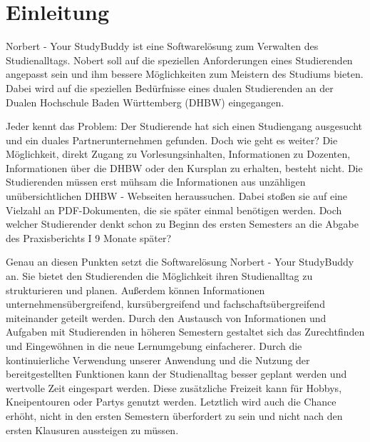 
\chapter{Einleitung}
Norbert - Your StudyBuddy ist eine Softwarelösung zum Verwalten des Studienalltags. Nobert soll auf die speziellen Anforderungen eines Studierenden angepasst sein und ihm bessere Möglichkeiten zum Meistern des Studiums bieten. Dabei wird auf die speziellen Bedürfnisse eines dualen Studierenden an der Dualen Hochschule Baden Württemberg (DHBW) eingegangen.

Jeder kennt das Problem: Der Studierende hat sich einen Studiengang ausgesucht und ein duales Partnerunternehmen gefunden. Doch wie geht es weiter? Die Möglichkeit, direkt Zugang zu Vorlesungsinhalten, Informationen zu Dozenten, Informationen über die DHBW oder den Kursplan zu erhalten, besteht nicht. Die Studierenden müssen erst mühsam die Informationen aus unzähligen unübersichtlichen DHBW - Webseiten heraussuchen. Dabei stoßen sie auf eine Vielzahl an PDF-Dokumenten, die sie später einmal benötigen werden. Doch welcher Studierender denkt schon zu Beginn des ersten Semesters an die Abgabe des Praxisberichts I 9 Monate später?

Genau an diesen Punkten setzt die Softwarelösung Norbert - Your StudyBuddy an. Sie bietet den Studierenden die Möglichkeit ihren Studienalltag zu strukturieren und planen. Außerdem können Informationen unternehmensübergreifend, kursübergreifend und fachschaftsübergreifend miteinander geteilt werden. Durch den Austausch von Informationen und Aufgaben mit Studierenden in höheren Semestern gestaltet sich das Zurechtfinden und Eingewöhnen in die neue Lernumgebung einfacherer. Durch die kontinuierliche Verwendung unserer Anwendung und die Nutzung der bereitgestellten Funktionen kann der Studienalltag besser geplant werden und wertvolle Zeit eingespart werden. Diese zusätzliche Freizeit kann für Hobbys, Kneipentouren oder Partys genutzt werden. Letztlich wird auch die Chance erhöht, nicht in den ersten Semestern überfordert zu sein und nicht nach den ersten Klausuren aussteigen zu müssen. 
